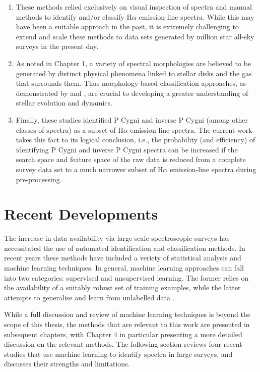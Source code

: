 \begin{enumerate}
\item These methods relied exclusively on visual inspection of spectra and manual methods to identify and/or classify H$\alpha$ emission-line spectra. While this may have been a suitable approach in the past, it is extremely challenging to extend and scale these methods to data sets generated by million star all-sky surveys in the present day.
\item As noted in Chapter 1, a variety of spectral morphologies are believed to be generated by distinct physical phenomena linked to stellar disks and the gas that surrounds them. Thus morphology-based classification approaches, as demonstrated by \citet{reipurth1996halpha} and \citet{1953PDAO....9....1B}, are crucial to developing a greater understanding of stellar evolution and dynamics.
\item Finally, these studies identified P Cygni and inverse P Cygni (among other classes of spectra) as a subset of H$\alpha$ emission-line spectra. The current work takes this fact to its logical conclusion, i.e., the probability (and efficiency) of identifying P Cygni and inverse P Cygni spectra can be increased if the search space and feature space of the raw data is reduced from a complete survey data set \citep[e.g., the complete GALAH survey DR3 catalogue;][]{buder2021galah+} to a much narrower subset of H$\alpha$ emission-line spectra during pre-processing. 
\end{enumerate}

\section{Recent Developments}
The increase in data availability via large-scale spectroscopic surveys has necessitated the use of automated identification and classification methods. In recent years these methods have included a veriety of statistical analysis and machine learning techniques. In general, machine learning approaches can fall into two categories: supervised and unsupervised learning. The former relies on the availability of a suitably robust set of training examples, while the latter attempts to generalise and learn from unlabelled data \citep{hastie2009elements}. 

While a full discussion and review of machine learning techniques is beyond the scope of this thesis, the methods that are relevant to this work are presented in subsequent chapters, with Chapter 4 in particular presenting a more detailed discussion on the relevant methods. The following section reviews four recent studies that use machine learning to identify spectra in large surveys, and discusses their strengths and limitations.

